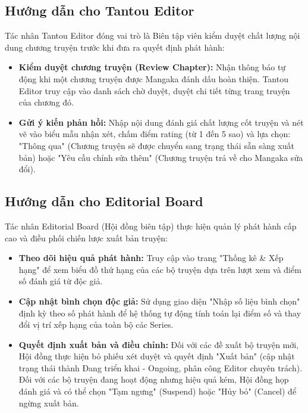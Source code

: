 \subsection{Hướng dẫn cho Tantou Editor}
\label{subsec:manual_tantou}
Tác nhân Tantou Editor đóng vai trò là Biên tập viên kiểm duyệt chất lượng nội dung chương truyện trước khi đưa ra quyết định phát hành:
\begin{itemize}
    \item \textbf{Kiểm duyệt chương truyện (Review Chapter):} Nhận thông báo tự động khi một chương truyện được Mangaka đánh dấu hoàn thiện. Tantou Editor truy cập vào danh sách chờ duyệt, duyệt chi tiết từng trang truyện của chương đó.
    \item \textbf{Gửi ý kiến phản hồi:} Nhập nội dung đánh giá chất lượng cốt truyện và nét vẽ vào biểu mẫu nhận xét, chấm điểm rating (từ 1 đến 5 sao) và lựa chọn: "Thông qua" (Chương truyện sẽ được chuyển sang trạng thái sẵn sàng xuất bản) hoặc "Yêu cầu chỉnh sửa thêm" (Chương truyện trả về cho Mangaka sửa đổi).
\end{itemize}

\subsection{Hướng dẫn cho Editorial Board}
\label{subsec:manual_editorial}
Tác nhân Editorial Board (Hội đồng biên tập) thực hiện quản lý phát hành cấp cao và điều phối chiến lược xuất bản truyện:
\begin{itemize}
    \item \textbf{Theo dõi hiệu quả phát hành:} Truy cập vào trang "Thống kê \& Xếp hạng" để xem biểu đồ thứ hạng của các bộ truyện dựa trên lượt xem và điểm số đánh giá từ độc giả.
    \item \textbf{Cập nhật bình chọn độc giả:} Sử dụng giao diện "Nhập số liệu bình chọn" định kỳ theo số phát hành để hệ thống tự động tính toán lại điểm số và thay đổi vị trí xếp hạng của toàn bộ các Series.
    \item \textbf{Quyết định xuất bản và điều chỉnh:} Đối với các đề xuất bộ truyện mới, Hội đồng thực hiện bỏ phiếu xét duyệt và quyết định "Xuất bản" (cập nhật trạng thái thành Đang triển khai - Ongoing, phân công Editor chuyên trách). Đối với các bộ truyện đang hoạt động nhưng hiệu quả kém, Hội đồng họp đánh giá và có thể chọn "Tạm ngưng" (Suspend) hoặc "Hủy bỏ" (Cancel) để ngừng xuất bản.
\end{itemize}

